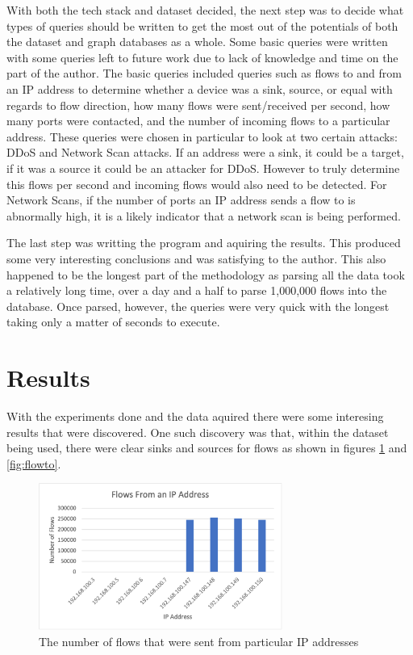 \documentclass[conference]{IEEEtran}
\begin{document}
With both the tech stack and dataset decided, the next step was to decide what types of queries should be
written to get the most out of the potentials of both the dataset and graph databases as a whole. Some basic
queries were written with some queries left to future work due to lack of knowledge and time on the part of 
the author. The basic queries included queries such as flows to and from an IP address to determine whether
a device was a sink, source, or equal with regards to flow direction, how many flows were sent/received per
second, how many ports were contacted, and the number of incoming flows to a particular address. These queries
were chosen in particular to look at two certain attacks: DDoS and Network Scan attacks. If an address were a 
sink, it could be a target, if it was a source it could be an attacker for DDoS. However to truly determine this
flows per second and incoming flows would also need to be detected. For Network Scans, if the number of ports
an IP address sends a flow to is abnormally high, it is a likely indicator that a network scan is being performed.

The last step was writting the program and aquiring the results. This produced some very interesting conclusions
and was satisfying to the author. This also happened to be the longest part of the methodology as parsing all the
data took a relatively long time, over a day and a half to parse 1,000,000 flows into the database. Once parsed,
however, the queries were very quick with the longest taking only a matter of seconds to execute.

\section{Results}

With the experiments done and the data aquired there were some interesing results that were discovered. One such
discovery was that, within the dataset being used, there were clear sinks and sources for flows as shown in figures
\ref{fig:flowfrom} and \ref{fig:flowto}.

\begin{figure}[htbp]
    \includegraphics[width=8cm]{Figure1.png}
    \centering
    \caption{The number of flows that were sent from particular IP addresses}
    \label{fig:flowfrom}
\end{figure}
\end{document}
